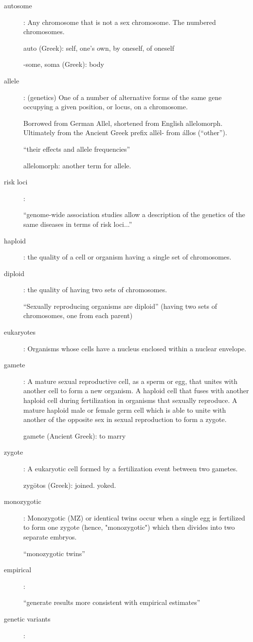 \begin{description}
\item[autosome] :
	Any chromosome that is not a sex chromosome. The numbered chromosomes.

	auto (Greek): self, one's own, by oneself, of oneself

	-some, soma (Greek): body

\item[allele] :
	(genetics) One of a number of alternative forms of the same gene occupying a given position, or locus, on a chromosome.

	Borrowed from German Allel, shortened from English allelomorph. Ultimately from the Ancient Greek prefix allēl- from állos (“other”).

	``their effects and allele frequencies''

	allelomorph: another term for allele.

\item[risk loci] :

	``genome-wide association studies allow a description of the genetics of the same diseases in terms of risk loci...''

\item[haploid] :
	the quality of a cell or organism having a single set of chromosomes.

\item[diploid] :
	the quality of having two sets of chromosomes.

	``Sexually reproducing organisms are diploid'' (having two sets of chromosomes, one from each parent)

\item[eukaryotes] :
	Organisms whose cells have a nucleus enclosed within a nuclear envelope.

\item[gamete] :
	A mature sexual reproductive cell, as a sperm or egg, that unites with another cell to form a new organism. A haploid cell that fuses with another haploid cell during fertilization in organisms that sexually reproduce. A mature haploid male or female germ cell which is able to unite with another of the opposite sex in sexual reproduction to form a zygote.

	gamete (Ancient Greek): to marry

\item[zygote] :
	A eukaryotic cell formed by a fertilization event between two gametes.

	zygōtos (Greek): joined. yoked.

\item[monozygotic] :
	Monozygotic (MZ) or identical twins occur when a single egg is fertilized to form one zygote (hence, "monozygotic") which then divides into two separate embryos.



	``monozygotic twins''

\item[empirical] :

	``generate results more consistent with empirical estimates''

	\item[genetic variants]:
\end{description}
